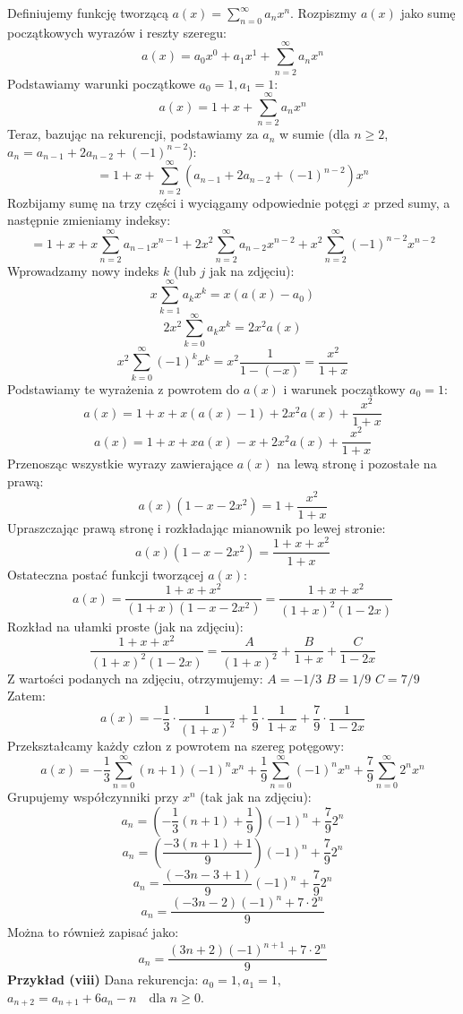\documentclass{mwart}
\begin{document}
\begin{mdframed}
    Definiujemy funkcję tworzącą $a(x) = \sum_{n=0}^{\infty} a_n x^n$.
    Rozpiszmy $a(x)$ jako sumę początkowych wyrazów i reszty szeregu:
    $$ a(x) = a_0 x^0 + a_1 x^1 + \sum_{n=2}^{\infty} a_n x^n $$
    Podstawiamy warunki początkowe $a_0 = 1, a_1 = 1$:
    $$ a(x) = 1 + x + \sum_{n=2}^{\infty} a_n x^n $$
    Teraz, bazując na rekurencji, podstawiamy za $a_n$ w sumie (dla $n \ge 2$, $a_n = a_{n-1} + 2a_{n-2} + (-1)^{n-2}$):
    $$ = 1 + x + \sum_{n=2}^{\infty} (a_{n-1} + 2a_{n-2} + (-1)^{n-2}) x^n $$
    Rozbijamy sumę na trzy części i wyciągamy odpowiednie potęgi $x$ przed sumy, a następnie zmieniamy indeksy:
    $$ = 1 + x + x \sum_{n=2}^{\infty} a_{n-1} x^{n-1} + 2x^2 \sum_{n=2}^{\infty} a_{n-2} x^{n-2} + x^2 \sum_{n=2}^{\infty} (-1)^{n-2} x^{n-2} $$
    Wprowadzamy nowy indeks $k$ (lub $j$ jak na zdjęciu):
    $$ x \sum_{k=1}^{\infty} a_k x^k = x(a(x) - a_0) $$
    $$ 2x^2 \sum_{k=0}^{\infty} a_k x^k = 2x^2 a(x) $$
    $$ x^2 \sum_{k=0}^{\infty} (-1)^k x^k = x^2 \frac{1}{1-(-x)} = \frac{x^2}{1+x} $$
    Podstawiamy te wyrażenia z powrotem do $a(x)$ i warunek początkowy $a_0=1$:
    $$ a(x) = 1 + x + x(a(x) - 1) + 2x^2 a(x) + \frac{x^2}{1+x} $$
    $$ a(x) = 1 + x + x a(x) - x + 2x^2 a(x) + \frac{x^2}{1+x} $$
    Przenosząc wszystkie wyrazy zawierające $a(x)$ na lewą stronę i pozostałe na prawą:
    $$ a(x) (1 - x - 2x^2) = 1 + \frac{x^2}{1+x} $$
    Upraszczając prawą stronę i rozkładając mianownik po lewej stronie:
    $$ a(x) (1 - x - 2x^2) = \frac{1+x+x^2}{1+x} $$
    Ostateczna postać funkcji tworzącej $a(x)$:
    $$ a(x) = \frac{1+x+x^2}{(1+x)(1 - x - 2x^2)} = \frac{1+x+x^2}{(1+x)^2 (1-2x)} $$
    Rozkład na ułamki proste (jak na zdjęciu):
    $$ \frac{1+x+x^2}{(1+x)^2 (1-2x)} = \frac{A}{(1+x)^2} + \frac{B}{1+x} + \frac{C}{1-2x} $$
    Z wartości podanych na zdjęciu, otrzymujemy:
    $A = -1/3$
    $B = 1/9$
    $C = 7/9$
    Zatem:
    $$ a(x) = -\frac{1}{3} \cdot \frac{1}{(1+x)^2} + \frac{1}{9} \cdot \frac{1}{1+x} + \frac{7}{9} \cdot \frac{1}{1-2x} $$
    Przekształcamy każdy człon z powrotem na szereg potęgowy:
    $$ a(x) = -\frac{1}{3} \sum_{n=0}^{\infty} (n+1)(-1)^n x^n + \frac{1}{9} \sum_{n=0}^{\infty} (-1)^n x^n + \frac{7}{9} \sum_{n=0}^{\infty} 2^n x^n $$
    Grupujemy współczynniki przy $x^n$ (tak jak na zdjęciu):
    $$ a_n = \left(-\frac{1}{3}(n+1) + \frac{1}{9}\right)(-1)^n + \frac{7}{9}2^n $$
    $$ a_n = \left(\frac{-3(n+1)+1}{9}\right)(-1)^n + \frac{7}{9}2^n $$
    $$ a_n = \frac{(-3n-3+1)}{9}(-1)^n + \frac{7}{9}2^n $$
    $$ a_n = \frac{(-3n-2)(-1)^n + 7 \cdot 2^n}{9} $$
    Można to również zapisać jako:
    $$ a_n = \frac{ (3n+2)(-1)^{n+1} + 7 \cdot 2^n }{9} $$
    \textbf{Przykład (viii)}\newline
    Dana rekurencja:
    $a_0 = 1, a_1 = 1,$
    $a_{n+2} = a_{n+1} + 6a_n - n \quad \text{dla } n \ge 0.$


\end{mdframed}
\end{document}
